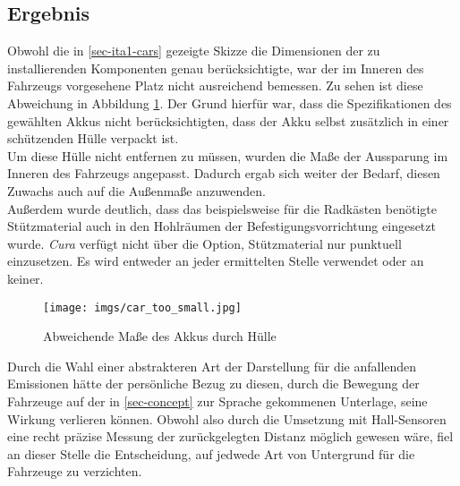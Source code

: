 \documentclass[.../Dokumentation.tex]{subfiles}
\begin{document}
\subsection{Ergebnis}\label{sec-ita1-result}
Obwohl die in \ref{sec-ita1-cars} gezeigte Skizze die Dimensionen der zu 
installierenden Komponenten genau berücksichtigte, war der im Inneren des 
Fahrzeugs vorgesehene Platz nicht ausreichend bemessen.
Zu sehen ist diese Abweichung in Abbildung \ref{fig-car-too-small}.
Der Grund hierfür war, dass die Spezifikationen des gewählten Akkus nicht 
berücksichtigten, dass der Akku selbst zusätzlich in einer schützenden Hülle 
verpackt ist.\\
Um diese Hülle nicht entfernen zu müssen, wurden die 
Maße der Aussparung im Inneren des Fahrzeugs angepasst. Dadurch ergab 
sich weiter der Bedarf, diesen Zuwachs auch auf die Außenmaße anzuwenden.\\
Außerdem wurde deutlich, dass das beispielsweise für die Radkästen benötigte 
Stützmaterial auch in den Hohlräumen der Befestigungsvorrichtung 
eingesetzt wurde. \textit{Cura} verfügt nicht über die Option, Stützmaterial nur 
punktuell einzusetzen. Es wird entweder an jeder ermittelten Stelle verwendet 
oder an keiner. 
\begin{figure}[H]
    \begin{center}
    \texttt{[image: imgs/car\_too\_small.jpg]}
    \caption{Abweichende Maße des Akkus durch Hülle}
    \label{fig-car-too-small}
    \end{center}
\end{figure}
\noindent
Durch die Wahl einer abstrakteren Art der Darstellung für die anfallenden 
Emissionen hätte der persönliche Bezug zu diesen, durch die Bewegung der 
Fahrzeuge auf der in \ref{sec-concept} zur Sprache gekommenen Unterlage, seine 
Wirkung verlieren können. Obwohl also durch die Umsetzung mit Hall-Sensoren 
eine recht präzise Messung der zurückgelegten Distanz möglich gewesen wäre, 
fiel an dieser Stelle die Entscheidung, auf jedwede Art von Untergrund 
für die Fahrzeuge zu verzichten.
\end{document}
